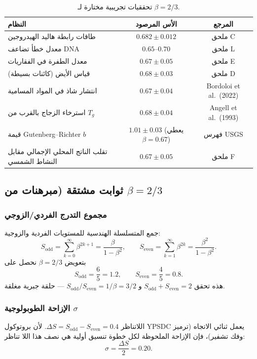 \documentclass[11pt,a4paper]{article}
\begin{document}
	\begin{table}[H]
		\centering
		\caption{تحققيات تجريبية مختارة لـ \(\beta = 2/3\).}
		\label{tab:beta-evidence}
		\small
		\begin{tabular}{l c c}
			\toprule
			\textbf{النظام} & \textbf{الأس المرصود} & \textbf{المرجع} \\
			\midrule
			طاقات رابطة هاليد الهيدروجين & \(0.682 \pm 0.012\) & ملحق C \\
			معدل خطأ تضاعف DNA & \(0.65\)–\(0.70\) & ملحق L \\
			معدل الطفرة في الفقاريات & \(0.67 \pm 0.05\) & ملحق E \\
			قياس الأيض (كائنات بسيطة) & \(0.68 \pm 0.03\) & ملحق D \\
			انتشار شاذ في المواد المسامية & \(0.67 \pm 0.04\) & Bordoloi et al.\ (2022) \\
			استرخاء الزجاج بالقرب من \(T_g\) & \(0.68 \pm 0.04\) & Angell et al.\ (1993) \\
			قيمة Gutenberg–Richter \(b\) & \(1.01 \pm 0.03\) (يعطي \(\beta=0.67\)) & فهرس USGS \\
			تقلب الناتج المحلي الإجمالي مقابل النشاط الشمسي & \(0.67 \pm 0.05\) & ملحق F \\
			\bottomrule
		\end{tabular}
	\end{table}
	
	\subsection{ثوابت مشتقة (مبرهنات من \(\beta = 2/3\)}
	
	\subsubsection{مجموع التدرج الفردي/الزوجي}
	جمع المتسلسلة الهندسية للمستويات الفردية والزوجية:
	\[
	S_{\mathrm{odd}} = \sum_{k=0}^{\infty} \beta^{2k+1} = \frac{\beta}{1-\beta^2},\qquad
	S_{\mathrm{even}} = \sum_{k=1}^{\infty} \beta^{2k} = \frac{\beta^2}{1-\beta^2}.
	\]
	بتعويض \(\beta = 2/3\) نحصل على
	\[
	\boxed{S_{\mathrm{odd}} = \frac{6}{5}=1.2,\qquad S_{\mathrm{even}} = \frac{4}{5}=0.8}.
	\]
	هذه تحقق \(S_{\mathrm{odd}}+S_{\mathrm{even}}=2\) و \(S_{\mathrm{odd}}/S_{\mathrm{even}} = 1/\beta = 3/2\) — حلقة جبرية مغلقة.
	
	\subsubsection{الإزاحة الطوبولوجية \(\sigma\)}
	اللاتناظر \(\Delta S = S_{\mathrm{odd}}-S_{\mathrm{even}} = 0.4\). لأن بروتوكول YPSDC يعمل ثنائي الاتجاه (ترميز وفك تشفير)، فإن الإزاحة الملحوظة لكل خطوة تنسيق أولية هي نصف هذا اللا تناظر:
	\[
	\boxed{\sigma = \frac{\Delta S}{2} = 0.20}.
	\]
	
\end{document}
